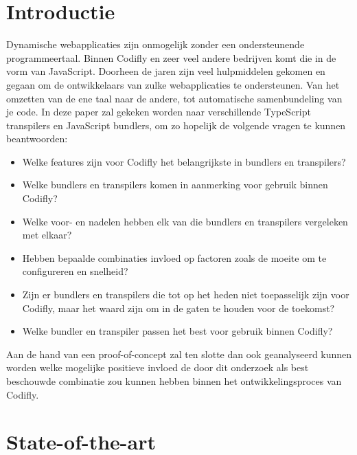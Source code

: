 \setlength{\parskip}{0.2em}

\section{Introductie} %
\label{sec:introductie}
Dynamische webapplicaties zijn onmogelijk zonder een ondersteunende programmeertaal. Binnen Codifly en zeer veel andere bedrijven komt die in de vorm van JavaScript. Doorheen de jaren zijn veel hulpmiddelen gekomen en gegaan om de ontwikkelaars van zulke webapplicaties te ondersteunen. Van het omzetten van de ene taal naar de andere, tot automatische samenbundeling van je code. In deze paper zal gekeken worden naar verschillende TypeScript transpilers en JavaScript bundlers, om zo hopelijk de volgende vragen te kunnen beantwoorden:

\begin{itemize}
    \item Welke features zijn voor Codifly het belangrijkste in bundlers en transpilers?
    \item Welke bundlers en transpilers komen in aanmerking voor gebruik binnen Codifly?
    \item Welke voor- en nadelen hebben elk van die bundlers en transpilers vergeleken met elkaar?
    \item Hebben bepaalde combinaties invloed op factoren zoals de moeite om te configureren en snelheid?
    \item Zijn er bundlers en transpilers die tot op het heden niet toepasselijk zijn voor Codifly, maar het waard zijn om in de gaten te houden voor de toekomst?
    \item Welke bundler en transpiler passen het best voor gebruik binnen Codifly?
\end{itemize}

Aan de hand van een proof-of-concept zal ten slotte dan ook geanalyseerd kunnen worden welke mogelijke positieve invloed de door dit onderzoek als best beschouwde combinatie zou kunnen hebben binnen het ontwikkelingsproces van Codifly.


\section{State-of-the-art}
\label{sec:state-of-the-art}

